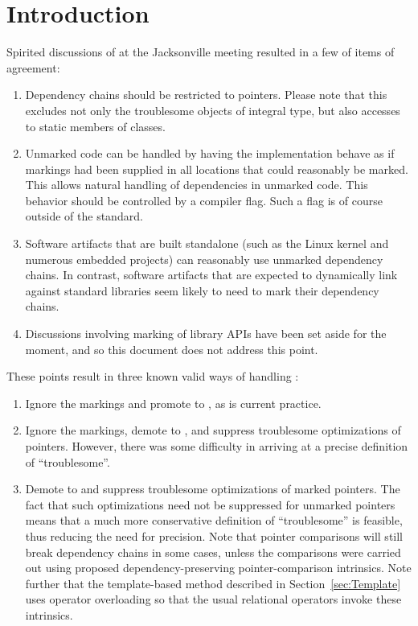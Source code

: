 \documentclass[letterpaper,10pt]{article}
\begin{document}

\section{Introduction}
\label{sec:Introduction}

Spirited discussions of 
at the Jacksonville meeting resulted in a few of items of agreement:

\begin{enumerate}
\item	Dependency chains should be restricted to pointers.
	Please note that this excludes not only the troublesome objects
	of integral type, but also accesses to static members of classes.
\item	Unmarked code can be handled by having the implementation
	behave as if markings had been supplied in all locations that
	could reasonably be marked.
	This allows natural handling of dependencies in unmarked code.
	This behavior should be controlled by a compiler flag.
	Such a flag is of course outside of the standard.
\item	Software artifacts that are built standalone (such as the Linux
	kernel and numerous embedded projects) can reasonably use
	unmarked dependency chains.
	In contrast, software artifacts that are expected to dynamically link
	against standard libraries seem likely to need to mark their
	dependency chains.
\item	Discussions involving marking of library APIs have been
	set aside for the moment, and so this document does not address
	this point.
\end{enumerate}

These points result in three known valid ways of handling
:

\begin{enumerate}
\item	Ignore the markings and promote 
	to , as is current practice.
\item	Ignore the markings, demote  to
	, and suppress troublesome
	optimizations of pointers.
	However, there was some difficulty in arriving at a precise
	definition of ``troublesome''.
\item	Demote  to 
	and suppress troublesome optimizations of marked pointers.
	The fact that such optimizations need not be suppressed
	for unmarked pointers means that a much more conservative
	definition of ``troublesome'' is feasible, thus reducing
	the need for precision.
	Note that pointer comparisons will still break dependency chains
	in some cases, unless the comparisons were carried out using
	proposed dependency-preserving pointer-comparison intrinsics.
	Note further that the template-based method described in
	Section~\ref{sec:Template}
	uses operator overloading so that the usual relational
	operators invoke these intrinsics.
\end{enumerate}
\end{document}
